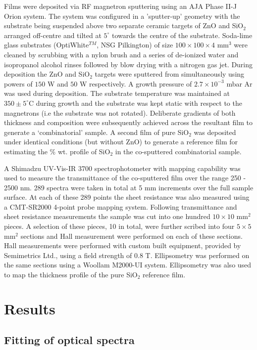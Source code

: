 \documentclass[preprint]{elsarticle}
\begin{document}
Films were deposited via RF magnetron sputtering using an AJA Phase II-J Orion system. The system was configured in a 'sputter-up' geometry with the substrate being suspended above two separate ceramic targets of ZnO and SiO$_2$ arranged off-centre and tilted at $5^{\circ}$ towards the centre of the substrate.  Soda-lime glass substrates (OptiWhite$^{TM}$, NSG Pilkington) of size $100\times100\times4$ mm$^{3}$ were cleaned by scrubbing with a nylon brush and a series of de-ionized water and isopropanol alcohol rinses followed by blow drying with a nitrogen gas jet. During deposition the ZnO and SiO$_2$ targets were sputtered from simultaneously using powers of $150$ W and $50$ W respectively. A growth pressure of $2.7\times10^{-3}$ mbar Ar was used during deposition. The substrate temperature was maintained at $350\pm5^{\circ}$C during growth and the substrate was kept static with respect to the magnetrons (i.e the substrate was not rotated). Deliberate gradients of both thickness and composition were subsequently achieved across the resultant film to generate a `combinatorial' sample. A second film of pure SiO$_{2}$ was deposited under identical conditions (but without ZnO) to generate a reference film for estimating the \% wt. profile of SiO$_{2}$ in the co-sputtered combinatorial sample.

A Shimadzu UV-Vis-IR 3700 spectrophotometer with mapping capability was used to measure the transmittance of the co-sputtered film over the range 250 - 2500 nm. 289 spectra were taken in total at 5 mm increments over the full sample surface. At each of these 289 points the sheet resistance was also measured using a CMT-SR2000 4-point probe mapping system. Following transmittance and sheet resistance measurements the sample was cut into one hundred $10\times10$ mm$^2$ pieces. A selection of these pieces, 10 in total, were further scribed into four $5\times5$ mm$^2$ sections and Hall measurement were performed on each of these sections. Hall measurements were performed with custom built equipment, provided by Semimetrics Ltd., using a field strength of 0.8 T.  Ellipsometry was performed on the same sections using a Woollam M2000-UI system. Ellipsometry was also used to map the thickness profile of the pure SiO$_{2}$ reference film.

\section{Results}\label{sec:2}

\subsection{Fitting of optical spectra}\label{sec:2.1}
\end{document}
